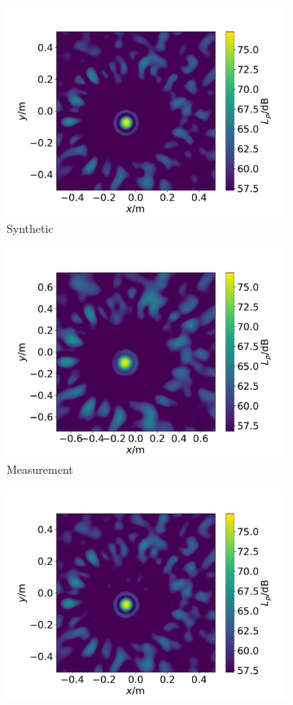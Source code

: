 \documentclass[12pt,pdftex,16x10]{elpres} %
\begin{document}
\begin{psli}
  \begin{figure}
    \begin{subfigure}[b]{0.5\linewidth}
      \centering
      \includegraphics[width=0.75\linewidth]{figs/datasets_beamforming_example_synthetic.pdf} 
      \caption{Synthetic} 
    \end{subfigure}%
    \begin{subfigure}[b]{0.5\linewidth}
      \centering
      \includegraphics[width=0.75\linewidth]{figs/datasets_beamforming_example_measurement.pdf} 
      \caption{Measurement} 
    \end{subfigure} 
    \begin{subfigure}[b]{0.5\linewidth}
      \centering
      \includegraphics[width=0.75\linewidth]{figs/data_augmentation_evals_augmented_csm.pdf} 

\end{subfigure}
\end{figure}
\end{psli}
\end{document}
